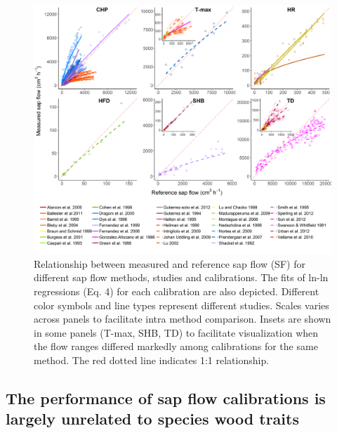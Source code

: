 \documentclass[11pt,twoside]{reedthesis}
\begin{document}
\begin{figure}[p]

{\centering \includegraphics[width=1\linewidth]{figure/CH2/figure-totalflow} 

}

\caption[Relationship between measured and reference sap flow (SF) for different sap flow methods, studies and calibrations.]{Relationship between measured and reference sap flow (SF) for different sap flow methods, studies and calibrations. The fits of ln-ln regressions (Eq. 4) for each calibration are also depicted. Different color symbols and line types represent different studies. Scales varies across panels to facilitate intra method comparison. Insets are shown in some panels (T-max, SHB, TD) to facilitate visualization when the flow ranges differed markedly among calibrations for the same method. The red dotted line indicates 1:1 relationship.}\label{fig:ch2fig6}
\end{figure}
\subsection{The performance of sap flow calibrations is largely
unrelated to species wood
traits}\label{the-performance-of-sap-flow-calibrations-is-largely-unrelated-to-species-wood-traits}
\end{document}
